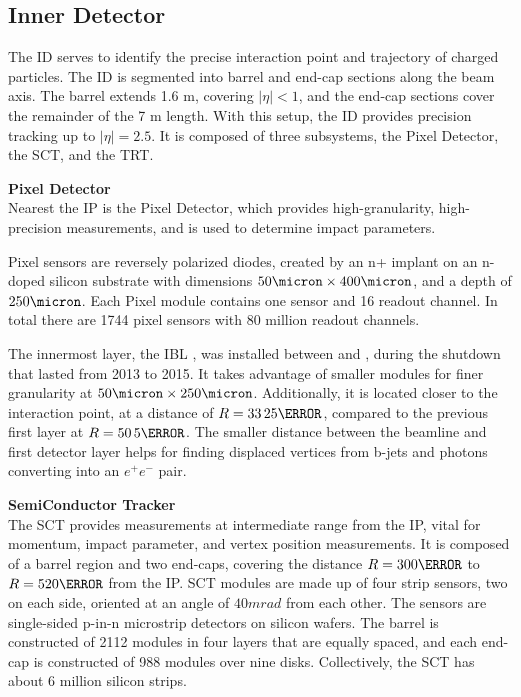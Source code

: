 \subsection{Inner Detector}  \label{ssec:innerdetector}

The \gls{ID} \cite{inner-detector-tdr} serves to identify the precise interaction point and trajectory of charged particles. The \gls{ID} is segmented into barrel and end-cap sections along the beam axis. The barrel extends 1.6 m, covering $|\eta| < 1$, and the end-cap sections cover the remainder of the 7 m length. With this setup, the \gls{ID} provides precision tracking up to $|\eta| = 2.5$. It is composed of three subsystems, the Pixel Detector, the \gls{SCT}, and the \gls{TRT}.

\noindent\textbf{Pixel Detector}\\
\indent Nearest the \gls{IP} is the Pixel Detector, which provides high-granularity, high-precision measurements, and is used to determine impact parameters.

Pixel sensors are reversely polarized diodes, created by an n+ implant on an n-doped silicon substrate with dimensions $ \unit{50}{\micron} \times \unit{400}{\micron}$, and a depth of $\unit{250}{\micron}$. Each Pixel module contains one sensor and 16 readout channel. In total there are 1744 pixel sensors with 80 million readout channels.
    
The innermost layer, the \gls{IBL} \cite{ibl-tdr}, was installed between \RunOne and \RunTwo, during the shutdown that lasted from 2013 to 2015. It takes advantage of smaller modules for finer granularity at $\unit{50}{\micron} \times \unit{250}{\micron}$. Additionally, it is located closer to the interaction point, at a distance of $R=\unit{33.25}{\mm}$, compared to the previous first layer at $R=\unit{50.5}{\mm}$. The smaller distance between the beamline and first detector layer helps for finding displaced vertices from b-jets and photons converting into an $e^+e^-$ pair.

\noindent\textbf{SemiConductor Tracker}\\
\indent The \gls{SCT} provides measurements at intermediate range from the \gls{IP}, vital for momentum, impact parameter, and vertex position measurements. It is composed of a barrel region and two end-caps, covering the distance $R=\unit{300}{\mm}$ to $R= \unit{520}{\mm}$ from the \gls{IP}. \gls{SCT} modules are made up of four strip sensors, two on each side, oriented at an angle of $\unit{40}{mrad}$ from each other. The sensors are single-sided p-in-n microstrip detectors on silicon wafers. The barrel is constructed of 2112 modules in four layers that are equally spaced, and each end-cap is constructed of 988 modules over nine disks. Collectively, the \gls{SCT} has about 6 million silicon strips.

